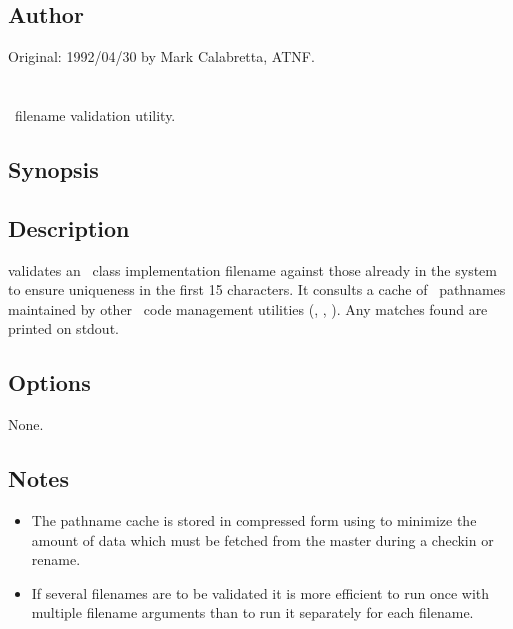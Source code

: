 \subsection*{Author}

Original: 1992/04/30 by Mark Calabretta, ATNF.


\newpage
\section{}
\label{av}

\aipspp\ filename validation utility.

\subsection*{Synopsis}

\begin{synopsis}
\end{synopsis}

\subsection*{Description}

 validates an \aipspp\ class implementation filename against those
already in the system to ensure uniqueness in the first 15 characters.  It
consults a cache of \aipspp\ pathnames maintained by other \aipspp\ 
code management utilities (, , ).  Any
matches found are printed on stdout.

\subsection*{Options}

None.

\subsection*{Notes}

\begin{itemize}
\item
   The pathname cache is stored in compressed form using  to
   minimize the amount of data which must be fetched from the master during a
   checkin or rename.

\item
   If several filenames are to be validated it is more efficient to run
   \exe{av} once with multiple filename arguments than to run it separately
   for each filename.
\end{itemize}

